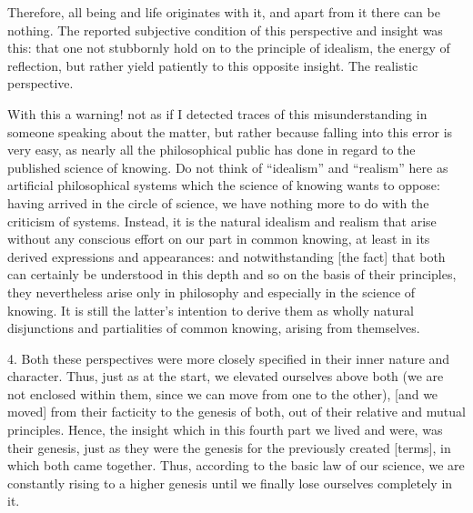 Therefore, all being and life originates with it,
and apart from it there can be nothing.
The reported subjective condition of
this perspective and insight was this:
that one not stubbornly hold on to
the principle of idealism,
the energy of reflection,
but rather yield patiently
to this opposite insight.
The realistic perspective.

With this a warning!
not as if I detected traces of this misunderstanding
in someone speaking about the matter,
but rather because falling into this error is very easy,
as nearly all the philosophical public has done
in regard to the published science of knowing.
Do not think of “idealism” and “realism”
here as artificial philosophical systems
which the science of knowing wants to oppose:
having arrived in the circle of science,
we have nothing more to do with the criticism of systems.
Instead, it is the natural idealism and realism
that arise without any conscious effort
on our part in common knowing,
at least in its derived expressions and appearances:
and notwithstanding [the fact] that
both can certainly be understood in this depth
and so on the basis of their principles,
they nevertheless arise only in philosophy
and especially in the science of knowing.
It is still the latter's intention
to derive them as wholly natural disjunctions
and partialities of common knowing,
arising from themselves.

4. Both these perspectives were more closely specified
in their inner nature and character.
Thus, just as at the start,
we elevated ourselves above both
(we are not enclosed within them,
since we can move from one to the other),
[and we moved] from their facticity to the genesis of both,
out of their relative and mutual principles.
Hence, the insight which in this fourth part
we lived and were, was their genesis,
just as they were the genesis
for the previously created [terms],
in which both came together.
Thus, according to the basic law of our science,
we are constantly rising to a higher genesis
until we finally lose ourselves completely in it.

